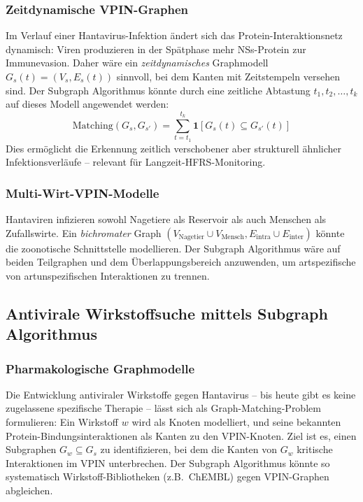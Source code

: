 ﻿\documentclass[a4paper,12pt]{article}
\theoremstyle{definition}
\begin{document}
\subsubsection{Zeitdynamische VPIN-Graphen}

Im Verlauf einer Hantavirus-Infektion \"andert sich das Protein-Interaktionsnetz
dynamisch: Viren produzieren in der Sp\"atphase mehr NSs-Protein zur
Immunevasion. Daher w\"are ein \emph{zeitdynamisches} Graphmodell
$G_s(t) = (V_s, E_s(t))$ sinnvoll, bei dem Kanten mit Zeitstempeln versehen
sind. Der Subgraph Algorithmus k\"onnte durch eine zeitliche Abtastung
$t_1, t_2, \ldots, t_k$ auf dieses Modell angewendet werden:
\[
    \text{Matching}(G_s, G_{s'}) = \sum_{t=t_1}^{t_k} \mathbf{1}[G_s(t) \subseteq G_{s'}(t)]
\]
Dies erm\"oglicht die Erkennung zeitlich verschobener aber strukturell
\"ahnlicher Infektionsverl\"aufe -- relevant f\"ur Langzeit-HFRS-Monitoring.

\subsubsection{Multi-Wirt-VPIN-Modelle}

Hantaviren infizieren sowohl Nagetiere als Reservoir als auch Menschen
als Zufallswirte. Ein \emph{bichromater} Graph $(V_{\mathrm{Nagetier}} \cup V_{\mathrm{Mensch}},
E_{\mathrm{intra}} \cup E_{\mathrm{inter}})$ k\"onnte die zoonotische
Schnittstelle modellieren. Der Subgraph Algorithmus w\"are auf
beiden Teilgraphen und dem \"Uberlappungsbereich anzuwenden, um
artspezifische von artunspezifischen Interaktionen zu trennen.

\subsection{Antivirale Wirkstoffsuche mittels Subgraph Algorithmus}

\subsubsection{Pharmakologische Graphmodelle}

Die Entwicklung antiviraler Wirkstoffe gegen Hantavirus -- bis heute gibt
es keine zugelassene spezifische Therapie -- l\"asst sich als
Graph-Matching-Problem formulieren: Ein Wirkstoff $w$ wird als Knoten
modelliert, und seine bekannten Protein-Bindungsinteraktionen als Kanten
zu den VPIN-Knoten. Ziel ist es, einen Subgraphen $G_w \subseteq G_s$
zu identifizieren, bei dem die Kanten von $G_w$ kritische Interaktionen
im VPIN unterbrechen. Der Subgraph Algorithmus k\"onnte so systematisch
Wirkstoff-Bibliotheken (z.B.\ ChEMBL) gegen VPIN-Graphen abgleichen.
\end{document}
